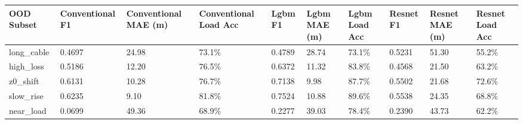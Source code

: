 \begin{tabular}{llllllllll}
\toprule
OOD Subset & Conventional F1 & Conventional MAE (m) & Conventional Load Acc & Lgbm F1 & Lgbm MAE (m) & Lgbm Load Acc & Resnet F1 & Resnet MAE (m) & Resnet Load Acc \\
\midrule
long\_cable & 0.4697 & 24.98 & 73.1\% & 0.4789 & 28.74 & 73.1\% & 0.5231 & 51.30 & 55.2\% \\
high\_loss & 0.5186 & 12.20 & 76.5\% & 0.6372 & 11.32 & 83.8\% & 0.4568 & 21.50 & 63.2\% \\
z0\_shift & 0.6131 & 10.28 & 76.7\% & 0.7138 & 9.98 & 87.7\% & 0.5502 & 21.68 & 72.6\% \\
slow\_rise & 0.6235 & 9.10 & 81.8\% & 0.7524 & 10.88 & 89.6\% & 0.5538 & 24.35 & 68.8\% \\
near\_load & 0.0699 & 49.36 & 68.9\% & 0.2277 & 39.03 & 78.4\% & 0.2390 & 43.73 & 62.2\% \\
\bottomrule
\end{tabular}
